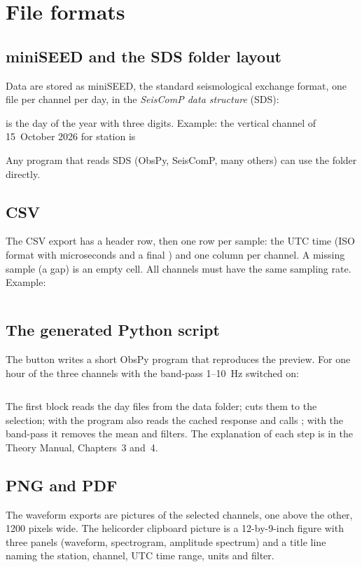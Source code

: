 \chapter{File formats}\label{app:formats}

\section{miniSEED and the SDS folder layout}\label{app:formats:sds}
Data are stored as miniSEED, the standard seismological exchange format, one file per channel per day, in the \emph{SeisComP data
structure} (SDS):
\begin{center}
\end{center}
 is the day of the year with three digits. Example: the vertical channel of 15~October 2026 for station  is
\begin{center}
\end{center}
Any program that reads SDS (ObsPy, SeisComP, many others) can use the folder directly.

\section{CSV}
The CSV export has a header row, then one row per sample: the UTC time (ISO format with microseconds and a final ) and one
column per channel. A missing sample (a gap) is an empty cell. All channels must have the same sampling rate. Example:

\inputminted{text}{../figures/sample.csv}

\section{The generated Python script}
The  button writes a short ObsPy program that reproduces the preview. For one hour of the three channels with the band-pass
1--10~Hz switched on:

\inputminted{python}{../figures/sample-script.py}

The first block reads the day files from the data folder;  cuts them to the selection; with  the program also reads
the cached response and calls ; with the band-pass it removes the mean and filters. The explanation of each step
is in the Theory Manual, Chapters~3 and~4.

\section{PNG and PDF}
The waveform exports are pictures of the selected channels, one above the other, 1200 pixels wide. The helicorder clipboard picture is a
12-by-9-inch figure with three panels (waveform, spectrogram, amplitude spectrum) and a title line naming the station, channel,
UTC time range, units and filter.
